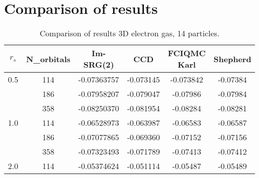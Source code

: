 \documentclass[11pt,a4wide]{article}
\begin{document}
\section*{Comparison of results}
\clearpage
\begin{table}
\begin{center}
\begin{tabular}{cccccc}
\hline\hline
$ r_s$ & 	N\_orbitals	 & Im-SRG(2)	& CCD &  	FCIQMC Karl & 	Shepherd \\
\hline 
0.5	 &114	&	-0.07363757 & 	-0.073145 &	-0.073842		&-0.07384 \\
	&186		&-0.07958207&	-0.079047	&-0.07986	&	-0.07984\\
	&358		&-0.08250370&	-0.081954&	-0.08284		&-0.08281\\
1.0&	114		&-0.06528973 & -0.063987	& -0.06583		& -0.06587\\
	& 186		&	-0.07077865 	& -0.069360	& -0.07152		& -0.07156\\
	& 358		&  -0.07323493  &		-0.071789&	-0.07413	&	-0.07412 \\
2.0	& 114		& 	-0.05374624	&-0.051114 & 	-0.05487		& -0.05489\\
\hline\hline
\end{tabular}
\end{center}
\caption{Comparison of results 3D electron gas, 14 particles.}
\end{table}
\end{document}

